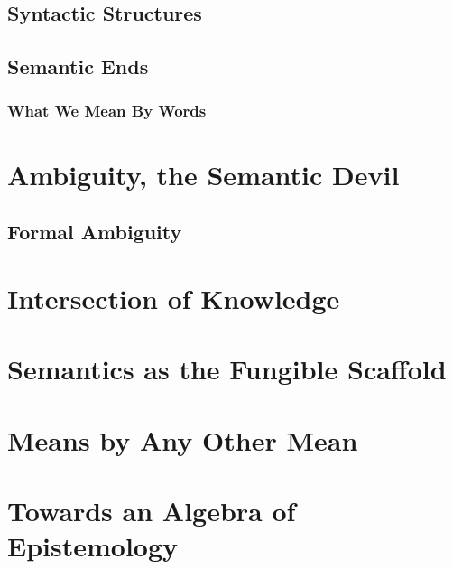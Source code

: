\documentclass[12pt]{article}
\begin{document}
\subsection{Syntactic Structures}
\subsection{Semantic Ends}
\subsubsection{What We Mean By Words}

\section{Ambiguity, the Semantic Devil}
\subsection{Formal Ambiguity}

\section{Intersection of Knowledge}

\section{Semantics as the Fungible Scaffold}

\section{Means by Any Other Mean}

\section{Towards an Algebra of Epistemology}
\end{document}
